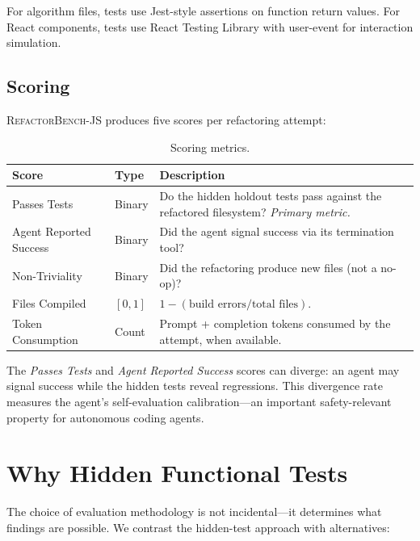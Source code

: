 \documentclass[11pt,letterpaper]{article}
\begin{document}
For algorithm files, tests use Jest-style assertions on function return values. For React components, tests use React Testing Library with user-event for interaction simulation.

\subsection{Scoring}

\textsc{RefactorBench}-JS produces five scores per refactoring attempt:

\begin{table}[ht]
\centering
\caption{Scoring metrics.}
\label{tab:scores}
\small
\begin{tabularx}{\textwidth}{llX}
\toprule
\textbf{Score} & \textbf{Type} & \textbf{Description} \\
\midrule
Passes Tests & Binary & Do the hidden holdout tests pass against the refactored filesystem? \emph{Primary metric.} \\
Agent Reported Success & Binary & Did the agent signal success via its termination tool? \\
Non-Triviality & Binary & Did the refactoring produce new files (not a no-op)? \\
Files Compiled & $[0,1]$ & $1 - (\text{build errors} / \text{total files})$. \\
Token Consumption & Count & Prompt + completion tokens consumed by the attempt, when available. \\
\bottomrule
\end{tabularx}
\end{table}

The \emph{Passes Tests} and \emph{Agent Reported Success} scores can diverge: an agent may signal success while the hidden tests reveal regressions. This divergence rate measures the agent's self-evaluation calibration---an important safety-relevant property for autonomous coding agents.

\section{Why Hidden Functional Tests}
\label{sec:why-hidden}

The choice of evaluation methodology is not incidental---it determines what findings are possible. We contrast the hidden-test approach with alternatives:
\end{document}
